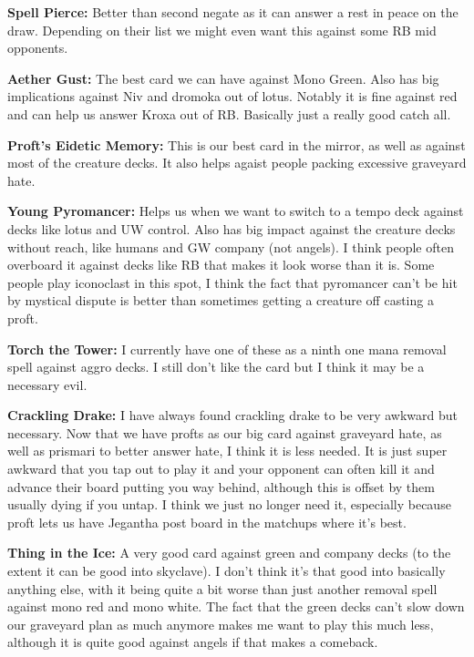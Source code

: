 \documentclass[12pt]{article}
\begin{document}
\vspace{0.4em}
\noindent \textbf{Spell Pierce:}
Better than second negate as it can answer a rest in peace on the draw. Depending on their list we might even want this against some RB mid opponents.

\vspace{0.4em}
\noindent \textbf{Aether Gust:}
The best card we can have against Mono Green. Also has big implications against Niv and dromoka out of lotus. Notably it is fine against red and can help us answer Kroxa out of RB. Basically just a really good catch all.

\vspace{0.4em}
\noindent \textbf{Proft's Eidetic Memory:}
This is our best card in the mirror, as well as against most of the creature decks. It also helps agaist people packing excessive graveyard hate.

\vspace{0.4em}
\noindent \textbf{Young Pyromancer:}
Helps us when we want to switch to a tempo deck against decks like lotus and UW control. Also has big impact against the creature decks without reach, like humans and GW company (not angels). I think people often overboard it against decks like RB that makes it look worse than it is. Some people play iconoclast in this spot, I think the fact that pyromancer can't be hit by mystical dispute is better than sometimes getting a creature off casting a proft.

\vspace{0.4em}
\noindent \textbf{Torch the Tower:}
I currently have one of these as a ninth one mana removal spell against aggro decks. I still don't like the card but I think it may be a necessary evil.

\vspace{0.4em}
\noindent \textbf{Crackling Drake:}
I have always found crackling drake to be very awkward but necessary. Now that we have profts as our big card against graveyard hate, as well as prismari to better answer hate, I think it is less needed. It is just super awkward that you tap out to play it and your opponent can often kill it and advance their board putting you way behind, although this is offset by them usually dying if you untap. I think we just no longer need it, especially because proft lets us have Jegantha post board in the matchups where it's best.

\vspace{0.4em}
\noindent \textbf{Thing in the Ice:}
A very good card against green and company decks (to the extent it can be good into skyclave). I don't think it's that good into basically anything else, with it being quite a bit worse than just another removal spell against mono red and mono white. The fact that the green decks can't slow down our graveyard plan as much anymore makes me want to play this much less, although it is quite good against angels if that makes a comeback.
\end{document}
